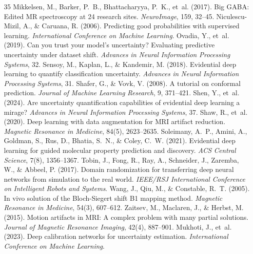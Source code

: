 \documentclass[11pt,a4paper]{article}
\begin{document}
\begin{thebibliography}{35}
 Mikkelsen, M., Barker, P.~B., Bhattacharyya, P.~K., et~al. (2017). Big GABA: Edited MR spectroscopy at 24 research sites. \emph{NeuroImage}, 159, 32--45.
 Niculescu-Mizil, A., \& Caruana, R. (2006). Predicting good probabilities with supervised learning. \emph{International Conference on Machine Learning}.
 Ovadia, Y., et~al. (2019). Can you trust your model's uncertainty? Evaluating predictive uncertainty under dataset shift. \emph{Advances in Neural Information Processing Systems}, 32.
 Sensoy, M., Kaplan, L., \& Kandemir, M. (2018). Evidential deep learning to quantify classification uncertainty. \emph{Advances in Neural Information Processing Systems}, 31.
 Shafer, G., \& Vovk, V. (2008). A tutorial on conformal prediction. \emph{Journal of Machine Learning Research}, 9, 371--421.
 Shen, Y., et~al. (2024). Are uncertainty quantification capabilities of evidential deep learning a mirage? \emph{Advances in Neural Information Processing Systems}, 37.
 Shaw, R., et~al. (2020). Deep learning with data augmentation for MRI artifact reduction. \emph{Magnetic Resonance in Medicine}, 84(5), 2623--2635.
 Soleimany, A.~P., Amini, A., Goldman, S., Rus, D., Bhatia, S.~N., \& Coley, C.~W. (2021). Evidential deep learning for guided molecular property prediction and discovery. \emph{ACS Central Science}, 7(8), 1356--1367.
 Tobin, J., Fong, R., Ray, A., Schneider, J., Zaremba, W., \& Abbeel, P. (2017). Domain randomization for transferring deep neural networks from simulation to the real world. \emph{IEEE/RSJ International Conference on Intelligent Robots and Systems}.
 Wang, J., Qiu, M., \& Constable, R.~T. (2005). In vivo solution of the Bloch-Siegert shift B1 mapping method. \emph{Magnetic Resonance in Medicine}, 54(3), 607--612.
 Zaitsev, M., Maclaren, J., \& Herbst, M. (2015). Motion artifacts in MRI: A complex problem with many partial solutions. \emph{Journal of Magnetic Resonance Imaging}, 42(4), 887--901.
 Mukhoti, J., et~al. (2023). Deep calibration networks for uncertainty estimation. \emph{International Conference on Machine Learning}.

\end{thebibliography}
\end{document}
